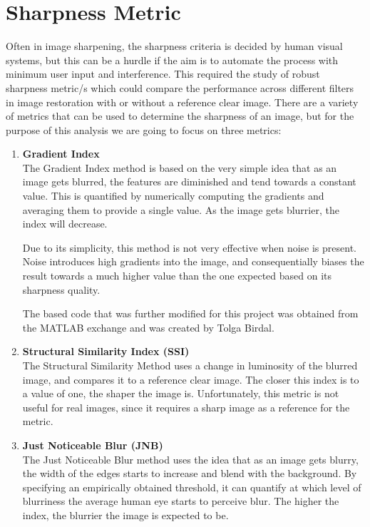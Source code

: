 \graphicspath{{mehul_pics/}}%

\section{Sharpness Metric}
Often in image sharpening, the sharpness criteria is decided by human visual systems, but this can be a hurdle if the aim is to automate the process with minimum user input and interference. This required the study of robust sharpness metric/s which could compare the performance across different filters in image restoration with or without a reference clear image. There are a variety of metrics that can be used to determine the sharpness of an image, but for the purpose of this analysis we are going to focus on three metrics:

\begin{enumerate}
\item {\bf Gradient Index} \\
The Gradient Index method is based on the very simple idea that as an image gets blurred, the features are diminished and tend towards a constant value. This is quantified by numerically computing the gradients and averaging them to provide a single value. As the image gets blurrier, the index will decrease. 

Due to its simplicity, this method is not very effective when noise is present. Noise introduces high gradients into the image, and consequentially biases the result towards a much higher value than the one expected based on its sharpness quality.  

The based code that was further modified for this project was obtained from the MATLAB exchange and was created by Tolga Birdal.

\item {\bf Structural Similarity Index (SSI)} \\
The Structural Similarity Method uses a change in luminosity of the blurred image, and compares it to a reference clear image. The closer this index is to a value of one, the shaper the image is. Unfortunately, this metric is not useful for real images, since it requires a sharp image as a reference for the metric.

\item {\bf Just Noticeable Blur (JNB)~\cite{Ferzli:2009}} \\
The Just Noticeable Blur method uses the idea that as an image gets blurry, the width of the edges starts to increase and blend with the background. By specifying an empirically obtained threshold, it can quantify at which level of blurriness the average human eye starts to perceive blur. The higher the index, the blurrier the image is expected to be.
\end{enumerate}
